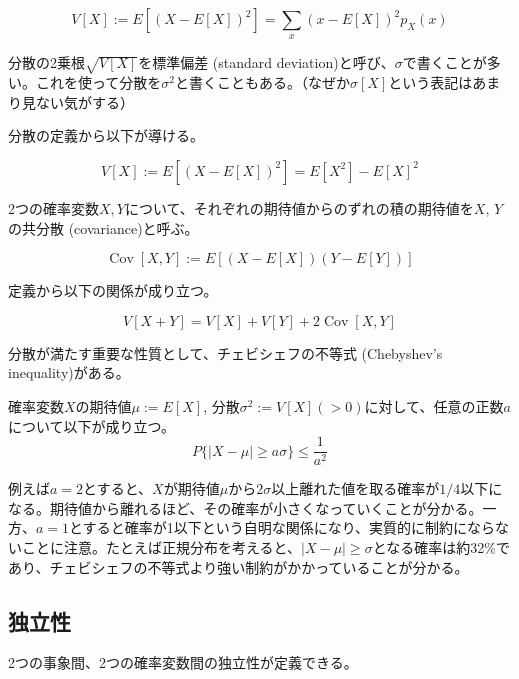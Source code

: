 \documentclass[uplatex,dvipdfmx]{jlreq}
\newcommand\term[1]{\textsf{#1}}
\begin{document}
\begin{equation}
    V[X] := E[(X-E[X])^2] = \sum_x (x-E[X])^2 p_X(x)
\end{equation}

分散の2乗根$\sqrt{V[X]}$を\term{標準偏差 (standard deviation)}と呼び、$\sigma$で書くことが多い。これを使って分散を$\sigma^2$と書くこともある。（なぜか$\sigma[X]$という表記はあまり見ない気がする）

分散の定義から以下が導ける。

\begin{equation}
    V[X] := E[(X-E[X])^2] = E[X^2] - E[X]^2
\end{equation}

2つの確率変数$X, Y$について、それぞれの期待値からのずれの積の期待値を$X$, $Y$の\term{共分散 (covariance)}と呼ぶ。

\begin{equation}
    \operatorname{Cov}[X, Y] :=
    E[(X-E[X])(Y-E[Y])]
\end{equation}

定義から以下の関係が成り立つ。

\begin{equation}
    V[X + Y] = V[X] + V[Y] + 2\operatorname{Cov}[X, Y]
\end{equation}

分散が満たす重要な性質として、\term{チェビシェフの不等式 (Chebyshev's inequality)}がある。

\begin{theorem}[チェビシェフの不等式]
    確率変数$X$の期待値$\mu:=E[X]$, 分散$\sigma^2:=V[X] (>0)$に対して、任意の正数$a$について以下が成り立つ。
    \begin{equation}
        P\{|X - \mu| \geq a\sigma\} \leq \frac{1}{a^2}
    \end{equation}
\end{theorem}

例えば$a=2$とすると、$X$が期待値$\mu$から$2\sigma$以上離れた値を取る確率が$1/4$以下になる。期待値から離れるほど、その確率が小さくなっていくことが分かる。一方、$a=1$とすると確率が1以下という自明な関係になり、実質的に制約にならないことに注意。たとえば正規分布を考えると、$|X-\mu|\geq\sigma$となる確率は約32\%であり、チェビシェフの不等式より強い制約がかかっていることが分かる。

\subsection{独立性}

2つの事象間、2つの確率変数間の独立性が定義できる。
\end{document}
